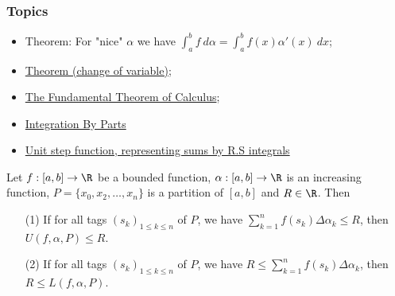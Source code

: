 \subsubsection{Topics}

\begin{itemize}
    \item Theorem: For "nice" \( \alpha \) we have \( \displaystyle \int_{ a }^{ b }  f  \ d \alpha  = \int_{ a }^{ b }  f(x) \alpha'(x) \ dx \);
    \item {\hyperref[Theorem (change of variable)]{Theorem (change of variable)}};
    \item {\hyperref[The Fundamental Theorem of Calculus]{The Fundamental Theorem of Calculus}}; 
    \item {\hyperref[Integration By Parts]{Integration By Parts}} 
    \item {\hyperref[Unit step function, representing sums by R.S integrals]{Unit step function, representing sums by R.S integrals}} 
\end{itemize}

\begin{lemma}
    Let \( f: [a,b] \to \R  \) be a bounded function, \( \alpha: [a,b] \to \R  \) is an increasing function, \( P = \{ {x}_{0}, {x}_{2}, \dots, {x}_{n} \}  \) is a partition of \( [a,b] \) and \( R \in \R  \). Then  
    \begin{enumerate}
        \item[(1)] If for all tags \( ({s}_{k })_{1 \leq k \leq n }  \) of \( P  \), we have \( \sum_{ k=1  }^{ n } f({s}_{k}) \Delta {\alpha}_{k } \leq R  \), then \( U(f,\alpha,P) \leq R  \).
        \item[(2)] If for all tags \( ({s}_{k})_{1 \leq k \leq n } \) of \( P  \), we have \( R \leq \sum_{ k=1  }^{ n } f({s}_{k}) \Delta {\alpha}_{k } \), then \( R \leq L(f,\alpha, P) \).
    \end{enumerate}
\end{lemma}

